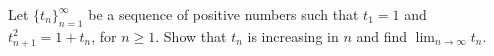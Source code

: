Let $\lbrace t_n \rbrace_{n=1}^{\infty}$ be a sequence of positive numbers such
that $t_1 = 1$ and $t_{n+1}^2 = 1 + t_n$, for $n \ge 1$. Show that $t_n$ is
increasing in $n$ and find $\displaystyle{\lim_{n \to \infty} t_n}$.

